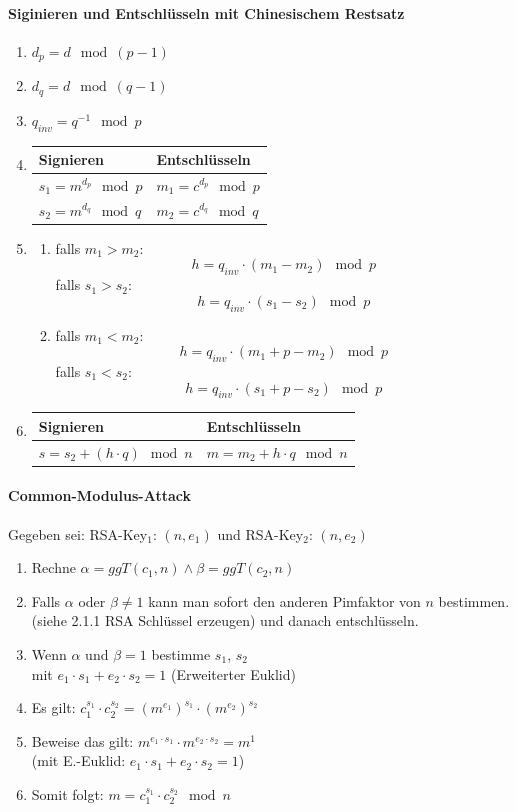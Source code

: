 \documentclass[8pt,a4paper,landscape]{article}
\begin{document}
\begin{multicols}{4}
\paragraph{Siginieren und Entschlüsseln mit Chinesischem Restsatz}
\begin{enumerate}
\item $d_p = d \mod (p-1)$ 
\item $d_q = d \mod (q-1)$
\item $q_{inv} = q^{-1} \mod p$
\item 
\begin{tabular}[t]{p{2.7cm} | p{2.7cm}}
Signieren & Entschlüsseln \\ \hline
$s_1 = m^{d_p} \mod p$ & $m_1 = c^{d_p} \mod p$ \\[0.2cm]
$s_2 = m^{d_q} \mod q$ & $m_2 = c^{d_q} \mod q$
\end{tabular}
\item \begin{enumerate}
\item falls $m_1 > m_2$: \[h = q_{inv} \cdot (m_1 - m_2) \mod p\] 
		falls $s_1 > s_2$: \[h = q_{inv} \cdot (s_1 - s_2) \mod p\] 
\item falls $m_1 < m_2$: \[h = q_{inv} \cdot (m_1 + p - m_2) \mod p\] 
		falls $s_1 < s_2$: \[h = q_{inv} \cdot (s_1 + p - s_2) \mod p\]\end{enumerate}
\item \begin{tabular}[t]{p{2.7cm} | p{2.7cm}}
Signieren & Entschlüsseln \\ \hline
$s = s_2 + (h \cdot q) \mod n$ & $m = m_2 + h \cdot q \mod n$
\end{tabular}
\end{enumerate}

\paragraph{Common-Modulus-Attack}
Gegeben sei: RSA-Key$_1$: $(n, e_1)$ und RSA-Key$_2$: $(n, e_2)$
\begin{enumerate}[itemsep=1pt] 
    \item Rechne $\alpha = ggT(c_1, n) \land \beta = ggT(c_2, n)$
    \item Falls $\alpha$ oder $\beta \neq 1$ kann man sofort den anderen Pimfaktor von $n$ bestimmen. (siehe 2.1.1 RSA Schlüssel erzeugen) und danach entschlüsseln.
    \item Wenn $\alpha$ und $ \beta = 1$ bestimme $s_1$, $s_2$\\ mit $e_1 \cdot s_1 + e_2 \cdot s_2 = 1$ (Erweiterter Euklid)
    \item Es gilt: $c_1^{s_1} \cdot c_2^{s_2} = (m^{e_1})^{s_1} \cdot (m^{e_2})^{s_2}$
    \item Beweise das gilt: $m^{e_1 \cdot s_1} \cdot m^{e_2 \cdot s_2} = m^1$ \\(mit E.-Euklid: $e_1 \cdot s_1 + e_2 \cdot s_2 = 1$)
    \item Somit folgt: $m = c_1^{s_1} \cdot c_2^{s_2} \mod n$
\end{enumerate}


\end{multicols}
\end{document}

